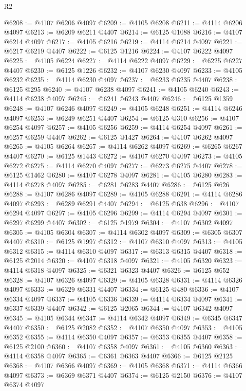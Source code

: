 \begin{lexlean}{R2}
\begin{coremodule}
@6208 := @4107 @6206 @4097
@6209 := @4105 @6208
@6211 := @4114 @6206 @4097
@6213 := @6209 @6211 @4407
@6214 := @6125 @1088
@6216 := @4107 @6214 @4097
@6217 := @4105 @6216
@6219 := @4114 @6214 @4097
@6221 := @6217 @6219 @4407
@6222 := @6125 @1216
@6224 := @4107 @6222 @4097
@6225 := @4105 @6224
@6227 := @4114 @6222 @4097
@6229 := @6225 @6227 @4407
@6230 := @6125 @1226
@6232 := @4107 @6230 @4097
@6233 := @4105 @6232
@6235 := @4114 @6230 @4097
@6237 := @6233 @6235 @4407
@6238 := @6125 @295
@6240 := @4107 @6238 @4097
@6241 := @4105 @6240
@6243 := @4114 @6238 @4097
@6245 := @6241 @6243 @4407
@6246 := @6125 @1359
@6248 := @4107 @6246 @4097
@6249 := @4105 @6248
@6251 := @4114 @6246 @4097
@6253 := @6249 @6251 @4407
@6254 := @6125 @310
@6256 := @4107 @6254 @4097
@6257 := @4105 @6256
@6259 := @4114 @6254 @4097
@6261 := @6257 @6259 @4407
@6262 := @6125 @1427
@6264 := @4107 @6262 @4097
@6265 := @4105 @6264
@6267 := @4114 @6262 @4097
@6269 := @6265 @6267 @4407
@6270 := @6125 @1443
@6272 := @4107 @6270 @4097
@6273 := @4105 @6272
@6275 := @4114 @6270 @4097
@6277 := @6273 @6275 @4407
@6278 := @6125 @1462
@6280 := @4107 @6278 @4097
@6281 := @4105 @6280
@6283 := @4114 @6278 @4097
@6285 := @6281 @6283 @4407
@6286 := @6125 @626
@6288 := @4107 @6286 @4097
@6289 := @4105 @6288
@6291 := @4114 @6286 @4097
@6293 := @6289 @6291 @4407
@6294 := @6125 @638
@6296 := @4107 @6294 @4097
@6297 := @4105 @6296
@6299 := @4114 @6294 @4097
@6301 := @6297 @6299 @4407
@6302 := @6125 @1979
@6304 := @4107 @6302 @4097
@6305 := @4105 @6304
@6307 := @4114 @6302 @4097
@6309 := @6305 @6307 @4407
@6310 := @6125 @1997
@6312 := @4107 @6310 @4097
@6313 := @4105 @6312
@6315 := @4114 @6310 @4097
@6317 := @6313 @6315 @4407
@6318 := @6125 @2014
@6320 := @4107 @6318 @4097
@6321 := @4105 @6320
@6323 := @4114 @6318 @4097
@6325 := @6321 @6323 @4407
@6326 := @6125 @652
@6328 := @4107 @6326 @4097
@6329 := @4105 @6328
@6331 := @4114 @6326 @4097
@6333 := @6329 @6331 @4407
@6334 := @6125 @480
@6336 := @4107 @6334 @4097
@6337 := @4105 @6336
@6339 := @4114 @6334 @4097
@6341 := @6337 @6339 @4407
@6342 := @6125 @2065
@6344 := @4107 @6342 @4097
@6345 := @4105 @6344
@6347 := @4114 @6342 @4097
@6349 := @6345 @6347 @4407
@6350 := @6125 @2082
@6352 := @4107 @6350 @4097
@6353 := @4105 @6352
@6355 := @4114 @6350 @4097
@6357 := @6353 @6355 @4407
@6358 := @6125 @2100
@6360 := @4107 @6358 @4097
@6361 := @4105 @6360
@6363 := @4114 @6358 @4097
@6365 := @6361 @6363 @4407
@6366 := @6125 @2125
@6368 := @4107 @6366 @4097
@6369 := @4105 @6368
@6371 := @4114 @6366 @4097
@6373 := @6369 @6371 @4407
@6374 := @6125 @2150
@6376 := @4107 @6374 @4097

\end{coremodule}
\end{lexlean}
